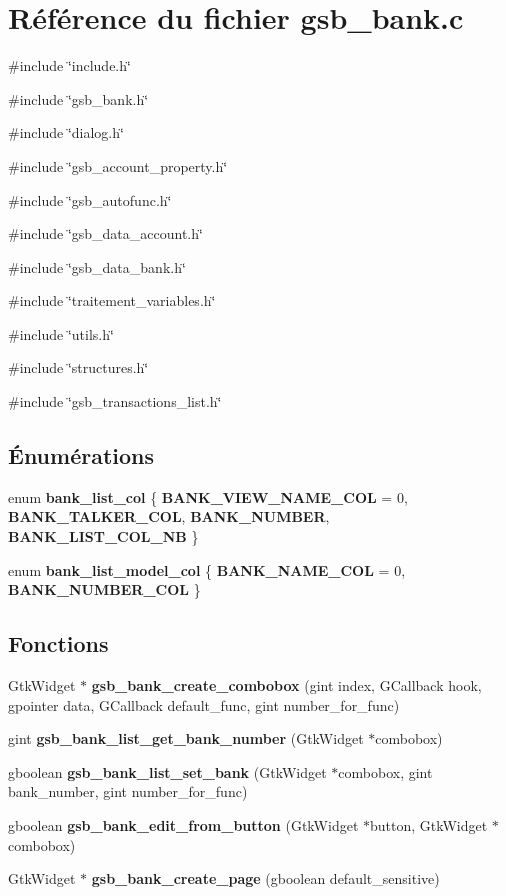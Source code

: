 \section{Référence du fichier gsb\_\-bank.c}
\label{gsb__bank_8c}
{\ttfamily \#include \char`\"{}include.h\char`\"{}}\par
{\ttfamily \#include \char`\"{}gsb\_\-bank.h\char`\"{}}\par
{\ttfamily \#include \char`\"{}dialog.h\char`\"{}}\par
{\ttfamily \#include \char`\"{}gsb\_\-account\_\-property.h\char`\"{}}\par
{\ttfamily \#include \char`\"{}gsb\_\-autofunc.h\char`\"{}}\par
{\ttfamily \#include \char`\"{}gsb\_\-data\_\-account.h\char`\"{}}\par
{\ttfamily \#include \char`\"{}gsb\_\-data\_\-bank.h\char`\"{}}\par
{\ttfamily \#include \char`\"{}traitement\_\-variables.h\char`\"{}}\par
{\ttfamily \#include \char`\"{}utils.h\char`\"{}}\par
{\ttfamily \#include \char`\"{}structures.h\char`\"{}}\par
{\ttfamily \#include \char`\"{}gsb\_\-transactions\_\-list.h\char`\"{}}\par
\subsection*{Énumérations}
\begin{DoxyCompactItemize}
\item 
enum {\bf bank\_\-list\_\-col} \{ {\bf BANK\_\-VIEW\_\-NAME\_\-COL} =  0, 
{\bf BANK\_\-TALKER\_\-COL}, 
{\bf BANK\_\-NUMBER}, 
{\bf BANK\_\-LIST\_\-COL\_\-NB}
 \}
\item 
enum {\bf bank\_\-list\_\-model\_\-col} \{ {\bf BANK\_\-NAME\_\-COL} =  0, 
{\bf BANK\_\-NUMBER\_\-COL}
 \}
\end{DoxyCompactItemize}
\subsection*{Fonctions}
\begin{DoxyCompactItemize}
\item 
GtkWidget $\ast$ {\bf gsb\_\-bank\_\-create\_\-combobox} (gint index, GCallback hook, gpointer data, GCallback default\_\-func, gint number\_\-for\_\-func)
\item 
gint {\bf gsb\_\-bank\_\-list\_\-get\_\-bank\_\-number} (GtkWidget $\ast$combobox)
\item 
gboolean {\bf gsb\_\-bank\_\-list\_\-set\_\-bank} (GtkWidget $\ast$combobox, gint bank\_\-number, gint number\_\-for\_\-func)
\item 
gboolean {\bf gsb\_\-bank\_\-edit\_\-from\_\-button} (GtkWidget $\ast$button, GtkWidget $\ast$combobox)
\item 
GtkWidget $\ast$ {\bf gsb\_\-bank\_\-create\_\-page} (gboolean default\_\-sensitive)
\end{DoxyCompactItemize}
